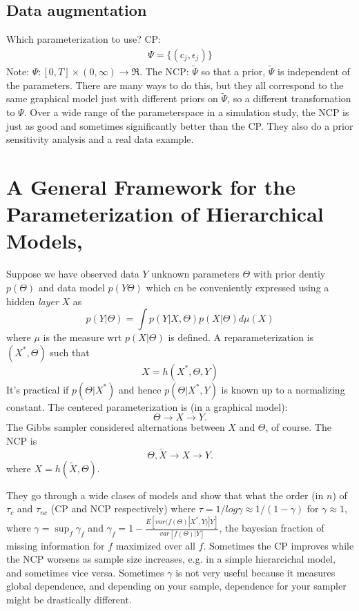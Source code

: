 \documentclass{article}\usepackage[]{graphicx}\usepackage[]{color}
\begin{document}
\subsection{Data augmentation}
Which parameterization to use? CP: 
\begin{align*}
  \Psi = \{(c_j, \epsilon_j)\}
\end{align*}
Note: $\Psi:[0, T]\times (0, \infty) \to \Re$.
The NCP: $\tilde{\Psi}$ so that a prior, $\tilde{\Psi}$ is independent of the parameters. There are many ways to do this, but they all correspond to the same graphical model just with different priors on $\tilde{\Psi}$, so a different transfornation to $\Psi$. Over a wide range of the parameterspace in a simulation study, the NCP is just as good and sometimes significantly better than the CP. They also do a prior sensitivity analysis and a real data example.

\section{A General Framework for the Parameterization of Hierarchical Models, \citet{papaspiliopoulos2007general}}
Suppose we have observed data $Y$ unknown parameters $\Theta$ with prior dentiy $p(\Theta)$ and data model $p(Y\Theta)$ which cn be conveniently expressed using a hidden {\it layer} $X$ as
\[
p(Y|\Theta) = \int p(Y|X,\Theta)p(X|\Theta)d\mu(X)
\]
where $\mu$ is the measure wrt $p(X|\Theta)$ is defined. A reparameterization is $(X^*,\Theta)$ such that
\[
X=h(X^*,\Theta,Y)
\]
It's practical if $p(\Theta|X^*)$ and hence $p(\Theta|X^*,Y)$ is known up to a normalizing constant. The centered parameterization is (in a graphical model):
\[
\Theta \to X \to Y.
\]
The Gibbs sampler considered alternations between $X$ and $\Theta$, of course. The NCP is
\[
\Theta, \tilde{X} \to X \to Y.
\]
where $X=h(\tilde{X},\Theta)$.

They go through a wide clases of models and show that what the order (in $n$) of $\tau_c$ and $\tau_{nc}$ (CP and NCP respectively) where $\tau = 1/log\gamma \approx 1/(1-\gamma)$ for $\gamma \approx 1$, where $\gamma = \sup_f\gamma_f$ and $\gamma_f = 1-\frac{E[var(f(\Theta)|X^*,Y)|Y]}{var[f(\Theta)|Y]}$, the bayesian fraction of missing information for $f$ maximized over all $f$. Sometimes the CP improves while the NCP worsens as sample size increases, e.g. in a simple hierarcichal model, and sometimes vice versa. Sometimes $\gamma$ is not very useful because it measures global dependence, and depending on your sample, dependence for your sampler might be drastically different.
\end{document}
